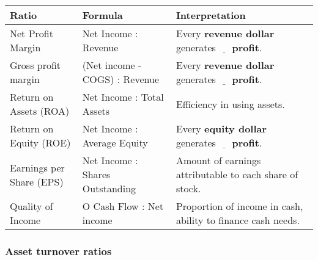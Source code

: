 \begin{table}[H]
    \centering
    \begin{tabular}{p{}p{}p{}}
        \hline
        \textbf{Ratio}           & \textbf{Formula}                & \textbf{Interpretation}                                                             \\
        \hline
        Net Profit Margin        & Net Income : Revenue            & Every \textbf{revenue dollar} generates $\underline{\hspace{1em}}$ \textbf{profit}. \\
        \hline
        Gross profit margin      & (Net income - COGS) : Revenue   & Every \textbf{revenue dollar} generates $\underline{\hspace{1em}}$ \textbf{profit}. \\
        \hline
        Return on Assets (ROA)   & Net Income : Total Assets       & Efficiency in using assets.                                                         \\
        \hline
        Return on Equity (ROE)   & Net Income : Average Equity     & Every \textbf{equity dollar} generates $\underline{\hspace{1em}}$ \textbf{profit}.  \\
        \hline
        Earnings per Share (EPS) & Net Income : Shares Outstanding & Amount of earnings attributable to each share of stock.                             \\
        \hline
        Quality of Income        & O Cash Flow : Net income        & Proportion of income in cash, ability to finance cash needs.                        \\
        \hline
    \end{tabular}
\end{table}

\subsubsection{Asset turnover ratios}

